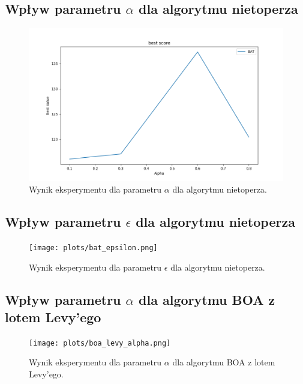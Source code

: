 \subsection{Wpływ parametru $\alpha$ dla algorytmu nietoperza}

\begin{figure}[H]
\centering
\includegraphics[width=1\textwidth]{plots/bat_alpha.png}
\caption{Wynik eksperymentu dla parametru $\alpha$ dla algorytmu nietoperza.}
\label{fig:alpha_bat}
\end{figure}

\subsection{Wpływ parametru $\epsilon$ dla algorytmu nietoperza}

\begin{figure}[H]
\centering
\texttt{[image: plots/bat\_epsilon.png]}
\caption{Wynik eksperymentu dla parametru $\epsilon$ dla algorytmu nietoperza.}
\label{fig:epsilon_bat}
\end{figure}

\subsection{Wpływ parametru $\alpha$ dla algorytmu BOA z lotem Levy’ego}

\begin{figure}[H]
\centering
\texttt{[image: plots/boa\_levy\_alpha.png]}
\caption{Wynik eksperymentu dla parametru $\alpha$ dla algorytmu BOA z lotem Levy’ego.}
\label{fig:alpha_levy}
\end{figure}
